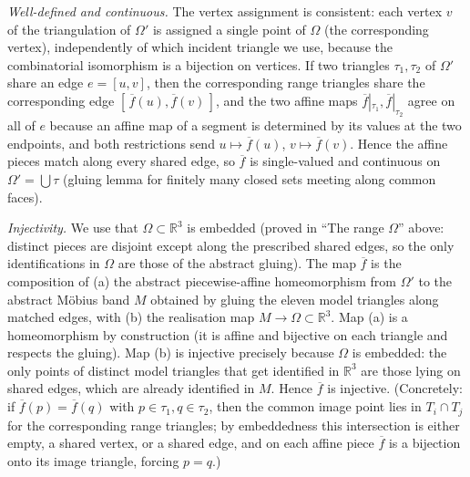 \documentclass[12pt]{article}
\newcommand{\R}{\mathbb{R}}
\begin{document}
\smallskip
\emph{Well-defined and continuous.} The vertex assignment is consistent:
each vertex $v$ of the triangulation of $\Omega'$ is assigned a single
point of $\Omega$ (the corresponding vertex), independently of which
incident triangle we use, because the combinatorial isomorphism is a
bijection on vertices. If two triangles $\tau_1,\tau_2$ of $\Omega'$ share
an edge $e=[u,v]$, then the corresponding range triangles share the
corresponding edge $[\,\overline f(u),\overline f(v)\,]$, and the two
affine maps $\overline f|_{\tau_1},\overline f|_{\tau_2}$ agree on all of
$e$ because an affine map of a segment is determined by its values at the
two endpoints, and both restrictions send $u\mapsto\overline f(u)$,
$v\mapsto\overline f(v)$. Hence the affine pieces match along every shared
edge, so $\overline f$ is single-valued and continuous on
$\Omega'=\bigcup\tau$ (gluing lemma for finitely many closed sets meeting
along common faces).

\smallskip
\emph{Injectivity.} We use that $\Omega\subset\R^3$ is embedded (proved in
``The range $\Omega$'' above: distinct pieces are disjoint except along the
prescribed shared edges, so the only identifications in $\Omega$ are those
of the abstract gluing). The map $\overline f$ is the composition of (a)
the abstract piecewise-affine homeomorphism from $\Omega'$ to the abstract
M\"obius band $M$ obtained by gluing the eleven model triangles along
matched edges, with (b) the realisation map $M\to\Omega\subset\R^3$. Map
(a) is a homeomorphism by construction (it is affine and bijective on each
triangle and respects the gluing). Map (b) is injective precisely because
$\Omega$ is embedded: the only points of distinct model triangles that get
identified in $\R^3$ are those lying on shared edges, which are already
identified in $M$. Hence $\overline f$ is injective. (Concretely: if
$\overline f(p)=\overline f(q)$ with $p\in\tau_1,q\in\tau_2$, then the
common image point lies in $T_{i}\cap T_{j}$ for the corresponding range
triangles; by embeddedness this intersection is either empty, a shared
vertex, or a shared edge, and on each affine piece $\overline f$ is a
bijection onto its image triangle, forcing $p=q$.)
\end{document}
